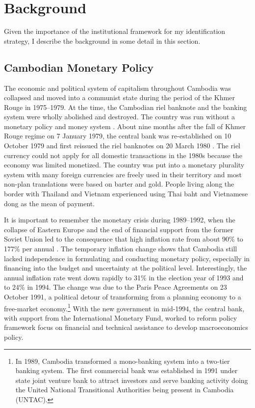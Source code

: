 \documentclass[11pt,letterpaper]{article}
\begin{document}


\section{Background}\label{sec:back}
Given the importance of the institutional framework for my identification strategy, I describe the background in some detail in this section.
\subsection{Cambodian Monetary Policy}
The economic and political system of capitalism throughout Cambodia was collapsed and moved into a communist state during the period of the Khmer Rouge in 1975--1979. At the time, the Cambodian riel banknote and the banking system were wholly abolished and destroyed. The country was run without a monetary policy and money system \cite{Duma2014}. About nine months after the fall of Khmer Rouge regime on 7 January 1979, the central bank was re-established on 10 October 1979 and first reissued the riel banknotes on 20 March 1980 \cite{Visoth2010}. The riel currency could not apply for all domestic transactions in the 1980s because the economy was limited monetized. The country was put into a monetary plurality system with many foreign currencies are freely used in their territory and most non-plan translations were based on barter and gold. People living along the border with Thailand and Vietnam experienced using Thai baht and Vietnamese dong as the mean of payment. 

It is important to remember the monetary crisis during 1989--1992, when the collapse of Eastern Europe and the end of financial support from the former Soviet Union led to the consequence that high inflation rate from about 90\% to 177\% per annual \cite{Chhun2005}. The temporary inflation change shows that Cambodia still lacked independence in formulating and conducting monetary policy, especially in financing into the budget and uncertainty at the political level. Interestingly, the annual inflation rate went down rapidly to 31\% in the election year of 1993 and to 24\% in 1994. The change was due to the Paris Peace Agreements on 23 October 1991, a political detour of transforming from a planning economy to a free-market economy.\footnote{In 1989, Cambodia transformed a mono-banking system into a two-tier banking system. The first commercial bank was established in 1991 under state joint venture bank to attract investors and serve banking activity doing the United National Transitional Authorities being present in Cambodia (UNTAC).} With the new government in mid-1994, the central bank, with support from the International Monetary Fund, worked to reform policy framework focus on financial and technical assistance to develop macroeconomics policy.
\end{document}
